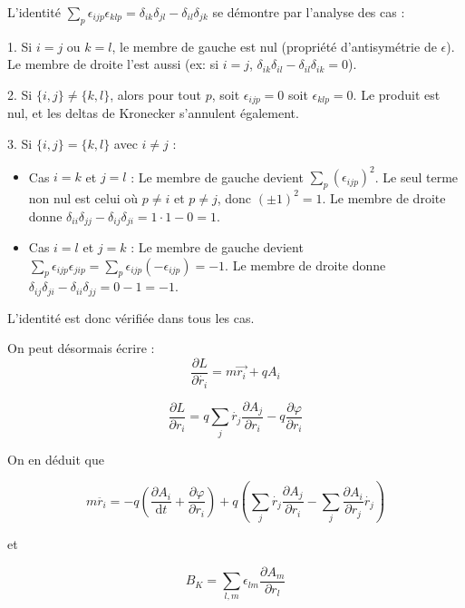 \documentclass[french]{yLectureNote}
\renewcommand{\vec}{\overrightarrow}
\newcommand{\dd}{\mathrm{d}}
\begin{document}
\begin{myproof}
    L'identité $\sum_{p} \epsilon_{ijp}\epsilon_{klp} = \delta_{ik}\delta_{jl} - \delta_{il}\delta_{jk}$ se démontre par l'analyse des cas :
    
    1. Si $i=j$ ou $k=l$, le membre de gauche est nul (propriété d'antisymétrie de $\epsilon$). Le membre de droite l'est aussi (ex: si $i=j$, $\delta_{ik}\delta_{il} - \delta_{il}\delta_{ik} = 0$).
    
    2. Si $\{i,j\} \neq \{k,l\}$, alors pour tout $p$, soit $\epsilon_{ijp}=0$ soit $\epsilon_{klp}=0$. Le produit est nul, et les deltas de Kronecker s'annulent également.
    
    3. Si $\{i,j\} = \{k,l\}$ avec $i \neq j$ :
    \begin{itemize}
        \item Cas $i=k$ et $j=l$ : Le membre de gauche devient $\sum_p (\epsilon_{ijp})^2$. Le seul terme non nul est celui où $p \neq i$ et $p \neq j$, donc $(\pm 1)^2 = 1$. Le membre de droite donne $\delta_{ii}\delta_{jj} - \delta_{ij}\delta_{ji} = 1\cdot 1 - 0 = 1$.
        \item Cas $i=l$ et $j=k$ : Le membre de gauche devient $\sum_p \epsilon_{ijp}\epsilon_{jip} = \sum_p \epsilon_{ijp}(-\epsilon_{ijp}) = -1$. Le membre de droite donne $\delta_{ij}\delta_{ji} - \delta_{ii}\delta_{jj} = 0 - 1 = -1$.
    \end{itemize}
    L'identité est donc vérifiée dans tous les cas.
\end{myproof}

On peut désormais écrire :
$$\frac{\partial L}{\partial \dot{r_i}} = m\vec{r_i}+qA_i$$ 

$$\frac{\partial L}{\partial {r_i}}= q\sum_j \dot{r_j} \frac{\partial A_j}{\partial r_i}-q\frac{\partial \varphi}{\partial r_i}$$

On en déduit que 

$$m\ddot{r_i} = -q(\frac{\partial A_i}{\dd t} + \frac{\partial \varphi}{\partial r_i})+ q(\sum_j \dot{r_j} \frac{\partial A_j}{\partial r_i} - \sum_j \frac{\partial A_i}{\partial r_j}\dot{r_j})$$

et 

$$B_K = \sum_{l,m}\epsilon_{lm}\frac{\partial A_m}{\partial r_l}$$
\end{document}
